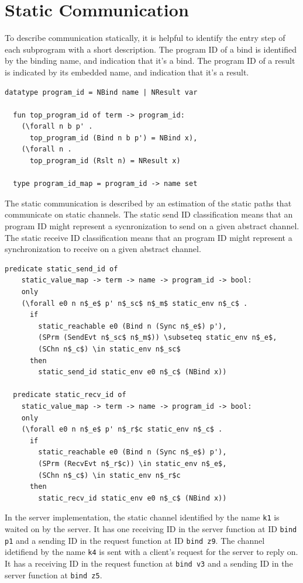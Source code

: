 \documentclass[10pt]{article}
\begin{document}
\section{Static Communication}
To describe communication statically, it is helpful to identify the entry
step of each subprogram with a short description. The program ID of a bind is
identified by the binding name, and indication that it's a bind. The program ID
of a result is indicated by its embedded name, and indication that it's a result.

\begin{lstlisting}[language=logic, mathescape]
  datatype program_id = NBind name | NResult var

  fun top_program_id of term -> program_id:
    (\forall n b p' . 
      top_program_id (Bind n b p') = NBind x),
    (\forall n . 
      top_program_id (Rslt n) = NResult x)

  type program_id_map = program_id -> name set

\end{lstlisting}

The static communication is described by an estimation of the static paths that communicate on
static channels.
The static send ID classification means that an program ID might represent a
sycnronization to send on a given abstract channel.
The static receive ID classification means that an program ID might represent a
synchronization to receive on a given abstract channel. 

\begin{lstlisting}[language=logic, mathescape]
  predicate static_send_id of
    static_value_map -> term -> name -> program_id -> bool:
    only
    (\forall e0 n n$_e$ p' n$_sc$ n$_m$ static_env n$_c$ .
      if
        static_reachable e0 (Bind n (Sync n$_e$) p'),
        (SPrm (SendEvt n$_sc$ n$_m$)) \subseteq static_env n$_e$, 
        (SChn n$_c$) \in static_env n$_sc$
      then
        static_send_id static_env e0 n$_c$ (NBind x))

  predicate static_recv_id of
    static_value_map -> term -> name -> program_id -> bool:
    only
    (\forall e0 n n$_e$ p' n$_r$c static_env n$_c$ .
      if
        static_reachable e0 (Bind n (Sync n$_e$) p'),
        (SPrm (RecvEvt n$_r$c)) \in static_env n$_e$, 
        (SChn n$_c$) \in static_env n$_r$c 
      then
        static_recv_id static_env e0 n$_c$ (NBind x))
  \end{lstlisting}


In the server implementation, the static channel identified by the name \lstinline{k1} is waited on
by the server.  It has
one receiving ID in the server function
at ID \lstinline[language=sugar_lang]{bind p1} and a sending ID
in the request function at ID \lstinline[language=sugar_lang]{bind z9}.
The channel idetifiend by the name \lstinline{k4} is sent with a client's request for
the server to reply on. It has a receiving ID in the request function at
\lstinline[language=sugar_lang]{bind v3} and a sending ID in the server function at
\lstinline[language=sugar_lang]{bind z5}.
\end{document}
